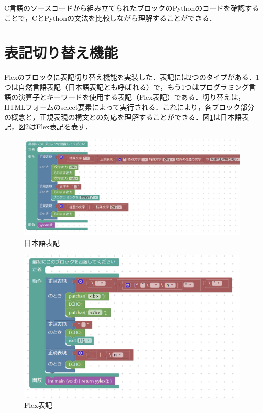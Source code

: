 \documentclass{risepaper}
\begin{document}
C言語のソースコードから組み立てられたブロックのPythonのコードを確認することで，CとPythonの文法を比較しながら理解することができる．
   
   \section{表記切り替え機能}
   
Flexのブロックに表記切り替え機能を実装した．表記には2つのタイプがある．1つは自然言語表記（日本語表記とも呼ばれる）で，もう1つはプログラミング言語の演算子とキーワードを使用する表記（Flex表記）である．切り替えは，HTMLフォームのselect要素によって実行される．これにより，各ブロック部分の概念と，正規表現の構文との対応を理解することができる．図\ref{fig:switching_ja}は日本語表記，図\ref{fig:switching_flex}はFlex表記を表す．

\begin{figure}[h]
\begin{center}
\includegraphics[scale=0.5]{img/switching_ja.PNG}
\caption{日本語表記}%
\label{fig:switching_ja}
\end{center}%
\end{figure}%

\begin{figure}[h]
\begin{center}
\includegraphics[scale=0.5]{img/switching_flex.PNG}
\caption{Flex表記}%
\label{fig:switching_flex}
\end{center}%
\end{figure}%
\end{document}

